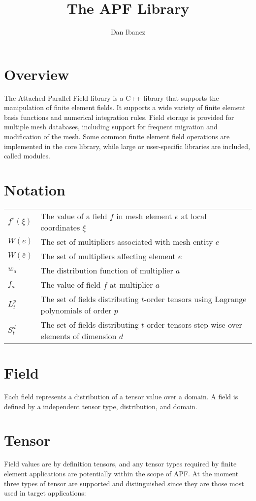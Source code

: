 \documentclass{article}
\title{The APF Library}
\author{Dan Ibanez}
\begin{document}
\maketitle

\section{Overview}
The Attached Parallel Field library is a C++ library that supports
the manipulation of finite element fields.
It supports a wide variety of finite element basis functions and
numerical integration rules.
Field storage is provided for multiple mesh databases, including
support for frequent migration and modification of the mesh.
Some common finite element field operations are implemented
in the core library, while large or user-specific libraries
are included, called modules.

\section{Notation}
\begin{tabular}{ll}
$f^e(\xi)$ & The value of a field $f$ in mesh element $e$ at local
coordinates $\xi$\\
$W(e)$ & The set of multipliers associated with mesh entity $e$\\
$W(\bar{e})$ & The set of multipliers affecting element $e$\\
$w_a$ & The distribution function of multiplier $a$\\
$f_a$ & The value of field $f$ at multiplier $a$\\
$L^p_t$ & The set of fields distributing $t$-order tensors
using Lagrange polynomials of order $p$\\
$S^d_t$ & The set of fields distributing $t$-order tensors
step-wise over elements of dimension $d$\\
\end{tabular}

\section{Field}
Each field represents a distribution of a tensor value over a domain.
A field is defined by a independent tensor type, distribution, and domain.

\section{Tensor}
Field values are by definition tensors, and any tensor types
required by finite element applications are potentially within
the scope of APF.
At the moment three types of tensor are supported and distinguished since
they are those most used in target applications:
\end{document}
